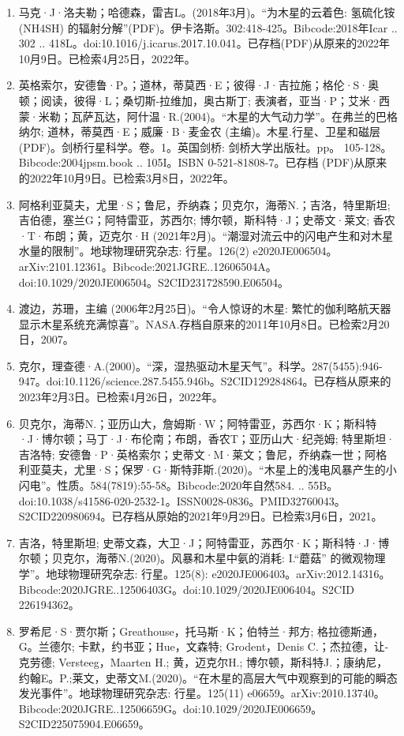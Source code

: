 \begin{enumerate}
\item 马克·J·洛夫勒；哈德森，雷吉L。(2018年3月)。“为木星的云着色: 氢硫化铵 (NH4SH) 的辐射分解”(PDF)。伊卡洛斯。302:418-425。Bibcode:2018年Icar .. 302 .. 418L。doi:10.1016/j.icarus.2017.10.041。已存档(PDF)从原来的2022年10月9日。已检索4月25日，2022年。
\item 英格索尔，安德鲁·P。；道林，蒂莫西·E；彼得·J·吉拉施；格伦·S·奥顿；阅读，彼得·L；桑切斯-拉维加，奥古斯丁; 表演者，亚当·P；艾米·西蒙·米勒；瓦萨瓦达，阿什温·R.(2004)。“木星的大气动力学”。在弗兰的巴格纳尔; 道林，蒂莫西·E；威廉·B·麦金农 (主编)。木星.行星、卫星和磁层(PDF)。剑桥行星科学。卷。1。英国剑桥: 剑桥大学出版社。pp。 105-128。Bibcode:2004jpsm.book .. 105I。ISBN  0-521-81808-7。已存档 (PDF)从原来的2022年10月9日。已检索3月8日，2022年。
\item 阿格利亚莫夫，尤里·S；鲁尼，乔纳森；贝克尔，海蒂N.；吉洛，特里斯坦; 吉伯德，塞兰G；阿特雷亚，苏西尔; 博尔顿，斯科特·J；史蒂文·莱文; 香农·T·布朗；黄，迈克尔·H (2021年2月)。“潮湿对流云中的闪电产生和对木星水量的限制”。地球物理研究杂志: 行星。126(2) e2020JE006504。arXiv:2101.12361。Bibcode:2021JGRE..12606504A。doi:10.1029/2020JE006504。S2CID231728590.E06504。 
\item 渡边，苏珊，主编 (2006年2月25日)。“令人惊讶的木星: 繁忙的伽利略航天器显示木星系统充满惊喜”。NASA.存档自原来的2011年10月8日。已检索2月20日，2007。
\item 克尔，理查德·A.(2000)。“深，湿热驱动木星天气”。科学。287(5455):946-947。doi:10.1126/science.287.5455.946b。S2CID129284864。已存档从原来的2023年2月3日。已检索4月26日，2022年。 
\item 贝克尔，海蒂N.；亚历山大，詹姆斯·W；阿特雷亚，苏西尔·K；斯科特·J·博尔顿；马丁·J·布伦南；布朗，香农T；亚历山大·纪尧姆; 特里斯坦·吉洛特; 安德鲁·P·英格索尔；史蒂文·M·莱文；鲁尼，乔纳森一世；阿格利亚莫夫，尤里·S；保罗·G·斯特菲斯.(2020)。“木星上的浅电风暴产生的小闪电”。性质。584(7819):55-58。Bibcode:2020年自然584. .. 55B。doi:10.1038/s41586-020-2532-1。ISSN0028-0836。PMID32760043。S2CID220980694。已存档从原始的2021年9月29日。已检索3月6日，2021。   
\item 吉洛，特里斯坦; 史蒂文森，大卫·J；阿特雷亚，苏西尔·K；斯科特·J·博尔顿；贝克尔，海蒂N.(2020)。风暴和木星中氨的消耗: I.“蘑菇” 的微观物理学”。地球物理研究杂志: 行星。125(8): e2020JE006403。arXiv:2012.14316。Bibcode:2020JGRE..12506403G。doi:10.1029/2020JE006404。S2CID 226194362。
\item 罗希尼·S·贾尔斯；Greathouse，托马斯·K；伯特兰·邦方; 格拉德斯通，G。兰德尔; 卡默，约书亚；Hue，文森特; Grodent，Denis C.；杰拉德，让-克劳德; Versteeg，Maarten H.; 黄，迈克尔H.; 博尔顿，斯科特J.；康纳尼，约翰E。P.;莱文，史蒂文M.(2020)。“在木星的高层大气中观察到的可能的瞬态发光事件”。地球物理研究杂志: 行星。125(11) e06659。arXiv:2010.13740。Bibcode:2020JGRE..12506659G。doi:10.1029/2020JE006659。S2CID225075904.E06659。 

\end{enumerate}
